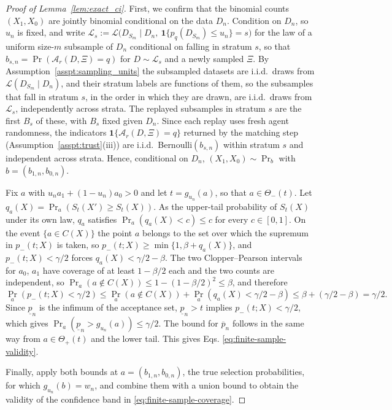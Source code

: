 \documentclass[10pt]{article}
\begin{document}
\begin{proof}[Proof of Lemma~\ref{lem:exact_ci}]
First, we confirm that the binomial counts $(X_1, X_0)$ are jointly binomial conditional on the data $D_n$. Condition on $D_n$, so $u_n$ is fixed, and write
$\mathcal L_s:=\mathcal L\big(D_{S_m}\mid D_n,\ \mathbf 1\{p_q(D_{S_m})\le u_n\}=s\big)$ for the law of a uniform size-$m$ subsample of $D_n$ conditional on falling in stratum $s$, so that $b_{s,n}=\Pr(\mathcal A_r(D,\Xi)=q)$ for $D\sim\mathcal L_s$ and a newly sampled $\Xi$. By Assumption~\ref{asspt:sampling_units} the subsampled datasets are i.i.d.\ draws from $\mathcal L(D_{S_m}\mid D_n)$, and their stratum labels are functions of them, so the subsamples that fall in stratum $s$, in the order in which they are drawn, are i.i.d.\ draws from $\mathcal L_s$, independently across strata. The replayed subsamples in stratum $s$ are the first $B_s$ of these, with $B_s$ fixed given $D_n$. Since each replay uses fresh agent randomness, the indicators $\mathbf 1\{\mathcal A_r(D,\Xi)=q\}$ returned by the matching step (Assumption~\ref{asspt:trust}(iii)) are i.i.d.\ Bernoulli$(b_{s,n})$ within stratum $s$ and independent across strata. Hence, conditional on $D_n$, $(X_1,X_0)\sim\Pr_b$ with $b=(b_{1,n},b_{0,n})$.

 Fix $a$ with $u_na_1+(1-u_n)a_0>0$ and let $t=g_{u_n}(a)$, so that $a\in\Theta_-(t)$. Let $q_a(X)=\Pr_a(S_t(X')\ge S_t(X))$. As the upper-tail probability of $S_t(X)$ under its own law, $q_a$ satisfies $\Pr_a(q_a(X)<c)\le c$ for every $c\in[0,1]$. On the event $\{a\in C(X)\}$ the point $a$ belongs to the set over which the supremum in $p_-(t;X)$ is taken, so $p_-(t;X)\ge\min\{1,\beta+q_a(X)\}$, and $p_-(t;X)<\gamma/2$ forces $q_a(X)<\gamma/2-\beta$. The two Clopper--Pearson intervals for $a_0$, $a_1$ have coverage of at least $1-\beta/2$ each and the two counts are independent, so $\Pr_a(a\notin C(X))\le1-(1-\beta/2)^2\le\beta$, and therefore
\[
\Pr_a(p_-(t;X)<\gamma/2)
\le\Pr_a(a\notin C(X))+\Pr_a(q_a(X)<\gamma/2-\beta)
\le\beta+(\gamma/2-\beta)=\gamma/2 .
\]
Since $\underline p_n$ is the infimum of the acceptance set, $\underline p_n>t$ implies $p_-(t;X)<\gamma/2$, which gives $\Pr_a(\underline p_n>g_{u_n}(a))\le\gamma/2$. The bound for $\overline p_n$ follows in the same way from $a\in\Theta_+(t)$ and the lower tail. This gives Eqs. \eqref{eq:finite-sample-validity}.

Finally, apply both bounds at $a=(b_{1,n}, b_{0,n})$, the true selection probabilities, for which $g_{u_n}(b)=w_n$, and combine them with a union bound to obtain the validity of the confidence band in \eqref{eq:finite-sample-coverage}.
\end{proof}
\end{document}
